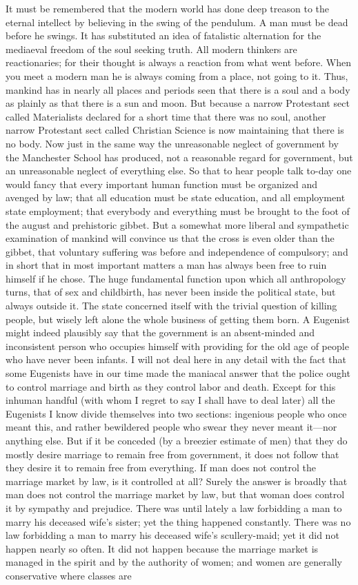 \documentclass{book}
\begin{document}
It must be remembered that the modern world has done deep treason to the eternal intellect by believing in the swing of the pendulum. A man must be dead before he swings. It has substituted an idea of fatalistic alternation for the mediaeval freedom of the soul seeking truth. All modern thinkers are reactionaries; for their thought is always a reaction from what went before. When you meet a modern man he is always coming from a place, not going to it. Thus, mankind has in nearly all places and periods seen that there is a soul and a body as plainly as that there is a sun and moon. But because a narrow Protestant sect called Materialists declared for a short time that there was no soul, another narrow Protestant sect called Christian Science is now maintaining that there is no body. Now just in the same way the unreasonable neglect of government by the Manchester School has produced, not a reasonable regard for government, but an unreasonable neglect of everything else. So that to hear people talk to-day one would fancy that every important human function must be organized and avenged by law; that all education must be state education, and all employment state employment; that everybody and everything must be brought to the foot of the august and prehistoric gibbet. But a somewhat more liberal and sympathetic examination of mankind will convince us that the cross is even older than the gibbet, that voluntary suffering was before and independence of compulsory; and in short that in most important matters a man has always been free to ruin himself if he chose. The huge fundamental function upon which all anthropology turns, that of sex and childbirth, has never been inside the political state, but always outside it. The state concerned itself with the trivial question of killing people, but wisely left alone the whole business of getting them born. A Eugenist might indeed plausibly say that the government is an absent-minded and inconsistent person who occupies himself with providing for the old age of people who have never been infants. I will not deal here in any detail with the fact that some Eugenists have in our time made the maniacal answer that the police ought to control marriage and birth as they control labor and death. Except for this inhuman handful (with whom I regret to say I shall have to deal later) all the Eugenists I know divide themselves into two sections: ingenious people who once meant this, and rather bewildered people who swear they never meant it—nor anything else. But if it be conceded (by a breezier estimate of men) that they do mostly desire marriage to remain free from government, it does not follow that they desire it to remain free from everything. If man does not control the marriage market by law, is it controlled at all? Surely the answer is broadly that man does not control the marriage market by law, but that woman does control it by sympathy and prejudice. There was until lately a law forbidding a man to marry his deceased wife’s sister; yet the thing happened constantly. There was no law forbidding a man to marry his deceased wife’s scullery-maid; yet it did not happen nearly so often. It did not happen because the marriage market is managed in the spirit and by the authority of women; and women are generally conservative where classes are 
\end{document}
